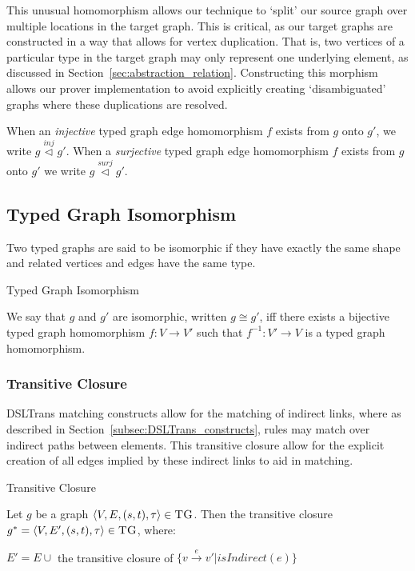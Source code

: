 This unusual homomorphism allows our technique to `split' our source graph over multiple locations in the target graph. This is critical, as our target graphs are constructed in a way that allows for vertex duplication. That is, two vertices of a particular type in the target graph may only represent one underlying element, as discussed in Section~\ref{sec:abstraction_relation}. Constructing this morphism allows our prover implementation to avoid explicitly creating `disambiguated' graphs where these duplications are resolved.

 When an \emph{injective} typed graph edge homomorphism $f$ exists from $g$ onto $g'$, we write $g \stackrel{inj}{\vartriangleleft} g'$. When a \emph{surjective} typed graph edge homomorphism $f$ exists from $g$ onto $g'$ we write $g \stackrel{surj}{\vartriangleleft} g'$.



\subsection*{Typed Graph Isomorphism}
Two typed graphs are said to be isomorphic if they have exactly the same shape and related vertices and edges have the same type.


\begin{definition}{Typed Graph Isomorphism\\}
\label{def:typed_graph_isomorphism}

We say that $g$ and $g'$ are isomorphic, written $g\cong g'$, iff there exists a bijective typed graph homomorphism $f:V\rightarrow V'$ such that $f^{-1}:V'\rightarrow V$ is a typed graph homomorphism.
\end{definition}




\subsubsection*{Transitive Closure}

DSLTrans matching constructs allow for the matching of indirect links, where as described in Section~\ref{subsec:DSLTrans_constructs}, rules may match over indirect paths between elements. This transitive closure allow for the explicit creation of all edges implied by these indirect links to aid in matching.


\begin{definition}{Transitive Closure\\}
\label{def:instance_closure}

Let $g$ be a graph $\langle V,E,(s, t),\tau\rangle \in \textsc{TG}$. Then the transitive closure $g^{*} = \langle V,E',(s, t),\tau\rangle \in \textsc{TG}$, where:

$E' = E \cup $ the transitive closure of $\big\{v\xrightarrow{e}v' | \mathit{isIndirect(e)} \big\}$
\end{definition}


